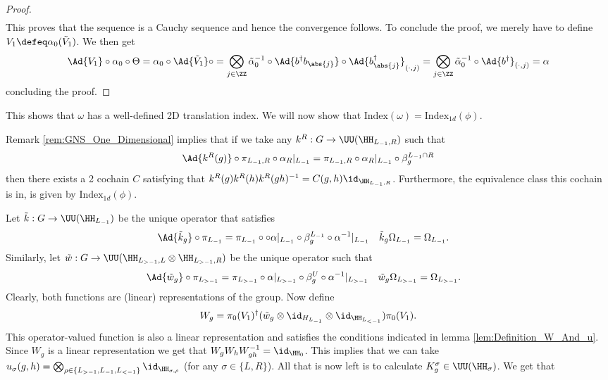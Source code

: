 \begin{proof}
\begin{align}
	\end{align}
	This proves that the sequence is a Cauchy sequence and hence the convergence follows. To conclude the proof, we merely have to define $V_1\defeq \alpha_0(\tilde{V}_1)$. We then get
	\begin{equation}
		\Ad{V_1}\circ \alpha_0\circ \Theta= \alpha_0\circ\Ad{\tilde V_1}\circ=\bigotimes_{j\in\ZZ}\tilde\alpha_0^{-1}\circ\Ad{b^\dagger b_\abs{j}}\circ \Ad{b_\abs{j}^\dagger}_{(\cdot,j)}=\bigotimes_{j\in\ZZ}\tilde\alpha_0^{-1}\circ\Ad{b^\dagger}_{(\cdot,j)}=\alpha
	\end{equation}
	concluding the proof.
\end{proof}
This shows that $\omega$ has a well-defined 2D translation index. We will now show that $\textrm{Index}(\omega)=\textrm{Index}_{1d}(\phi)$.
\begin{remark}
	Remark \ref{rem:GNS_One_Dimensional} implies that if we take any $k^R:G\rightarrow \UU(\HH_{L_{-1},R})$ such that
	\begin{equation}
		\Ad{k^R(g)}\circ\pi_{L_{-1},R}\circ\alpha_R|_{L_{-1}}=\pi_{L_{-1},R}\circ\alpha_R|_{L_{-1}}\circ\beta_{g}^{L_{-1}\cap R}
	\end{equation}
	then there exists a 2 cochain $C$ satisfying that $k^R(g)k^R(h)k^R(gh)^{-1}=C(g,h)\id_{\HH_{L_{-1},R}}$. Furthermore, the equivalence class this cochain is in, is given by $\textrm{Index}_{1d}(\phi)$.
\end{remark}
Let $\tilde k:G\rightarrow \UU(\HH_{L_{-1}})$ be the unique operator that satisfies
\begin{align}
	\Ad{\tilde{k}_g}\circ\pi_{L_{-1}}&=\pi_{L_{-1}}\circ \circ\alpha|_{L_{-1}}\circ\beta_g^{L_{-1}}\circ \alpha^{-1}|_{L_{-1}}&\tilde k_g\Omega_{L_{-1}}&=\Omega_{L_{-1}}.
\end{align}
Similarly, let $\tilde{w}:G\rightarrow\UU(\HH_{L_{>-1},L}\otimes\HH_{L_{>-1},R})$ be the unique operator such that
\begin{align}
	\Ad{\tilde w_{g}}\circ\pi_{L_{>-1}}&=\pi_{L_{>-1}}\circ\alpha|_{L_{>-1}}\circ\beta_g^{U}\circ \alpha^{-1}|_{L_{>-1}}&\tilde w_{g}\Omega_{L_{>-1}}&=\Omega_{L_{>-1}}.
\end{align}
Clearly, both functions are (linear) representations of the group. Now define
\begin{equation}\label{eq:ChoiceOfW_g_ExampleH2Index}
	W_g=\pi_{0}(V_1)^{\dagger}(\tilde{w}_g\otimes\id_{H_{L_{-1}}}\otimes\id_{\HH_{L_{<-1}}}) \pi_{0}(V_1).
\end{equation}
This operator-valued function is also a linear representation and satisfies the conditions indicated in lemma \ref{lem:Definition_W_And_u}. Since $W_g$ is a linear representation we get that $W_gW_hW_{gh}^{-1}=\id_{\HH_0}$. This implies that we can take $u_\sigma(g,h)=\bigotimes_{\rho\in\{L_{>-1},L_{-1},L_{<-1}\}}\id_{\HH_{\sigma,\rho}}$ (for any $\sigma\in\{L,R\}$). All that is now left is to calculate $K^\sigma_g\in\UU(\HH_\sigma)$. We get that
